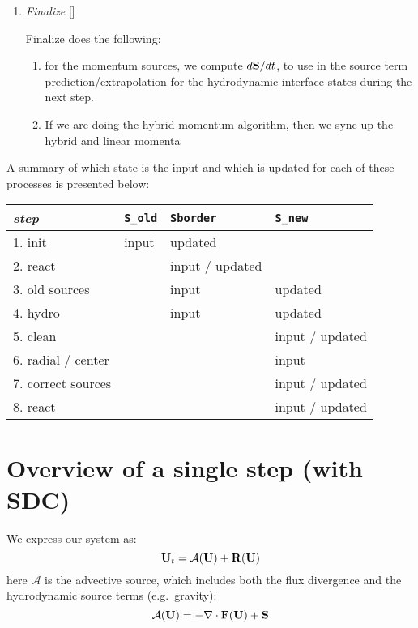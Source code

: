 \begin{enumerate}
\item \label{strang:finalize} {\em Finalize} []

  Finalize does the following:
  \begin{enumerate}
  \item for the momentum sources, we compute $d{\bf S}/dt$, to use in the
    source term prediction/extrapolation for the hydrodynamic
    interface states during the next step.

  \item If we are doing the hybrid momentum algorithm, then we sync up
    the hybrid and linear momenta
  \end{enumerate}

\end{enumerate}

A summary of which state is the input and which is updated for each of
these processes is presented below:
\begin{center}
\renewcommand{\arraystretch}{1.5}
\begin{tabular}{l|lll}
{\em step} & {\tt S\_old} & {\tt Sborder} & {\tt S\_new} \\
\hline
1. init    &   input      &   updated \\
2. react   &              &    input / updated \\
3. old sources &          &   input    & updated \\
4. hydro   &              & input      & updated \\
5. clean   &              &            & input / updated \\
6. radial / center  &     &            & input \\
7. correct sources &      &            & input / updated \\
8. react   &              &            & input / updated
\end{tabular}
\end{center}


\section{Overview of a single step (with SDC)}

We express our system as:
\begin{equation}
{\bf U}_t = \mathcal{A}({\bf U}) + {\bf R}({\bf U})
\end{equation}
here $\mathcal{A}$ is the advective source, which includes both the 
flux divergence and the hydrodynamic source terms (e.g.\ gravity):
\begin{equation}
\mathcal{A}({\bf U}) = -\nabla \cdot {\bf F}({\bf U}) + {\bf S}
\end{equation}

